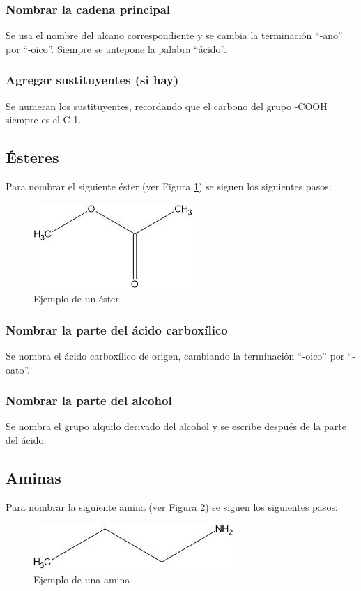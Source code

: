 \documentclass{article}
\begin{document}
\subsubsection{Nombrar la cadena principal}
Se usa el nombre del alcano correspondiente y se cambia la terminación ``-ano'' por ``-oico''. Siempre se antepone la palabra ``ácido''.

\subsubsection{Agregar sustituyentes (si hay)}
Se numeran los sustituyentes, recordando que el carbono del grupo -COOH siempre es el C-1.

\subsection{Ésteres}
Para nombrar el siguiente éster (ver Figura \ref{fig:ester}) se siguen los siguientes pasos:
\begin{figure}[h]
    \centering
    \includegraphics[width=0.5\linewidth]{media/etanoato de metilo.jpg}
    \caption{Ejemplo de un éster}
    \label{fig:ester}
\end{figure}

\subsubsection{Nombrar la parte del ácido carboxílico}
Se nombra el ácido carboxílico de origen, cambiando la terminación ``-oico'' por ``-oato''.

\subsubsection{Nombrar la parte del alcohol}
Se nombra el grupo alquilo derivado del alcohol y se escribe después de la parte del ácido.

\subsection{Aminas}
Para nombrar la siguiente amina (ver Figura \ref{fig:amina}) se siguen los siguientes pasos:
\begin{figure}[h]
    \centering
    \includegraphics[width=0.5\linewidth]{media/propilamida.jpg}
    \caption{Ejemplo de una amina}
    \label{fig:amina}
\end{figure}
\end{document}
